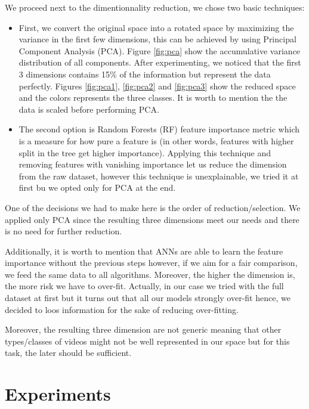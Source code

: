 \documentclass{article}
\begin{document}
We proceed next to the dimentionnality reduction, we chose two basic techniques:
\begin{itemize}
\item First, we convert the original space into a rotated space by maximizing the variance in the first few dimensions, this can be achieved by using Principal Component Analysis (PCA). Figure \ref{fig:pca} show the accumulative variance distribution of all components. After experimenting, we noticed that the first 3 dimensions contains 15\% of the information but represent the data perfectly. Figures \ref{fig:pca1}, \ref{fig:pca2} and \ref{fig:pca3} show the reduced space and the colors represents the three classes. It is worth to mention the the data is scaled before performing PCA.

\item The second option is Random Forests (RF) feature importance metric which is a measure for how pure a feature is (in other words, features with higher split in the tree get higher importance). Applying this technique and removing features with vanishing importance let us reduce the dimension from the raw dataset, however this technique is unexplainable, we tried it at first bu we opted only for PCA at the end.
\end{itemize}

One of the decisions we had to make here is the order of reduction/selection. We applied only PCA since the resulting three dimensions meet our needs and there is no need for further reduction.

Additionally, it is worth to mention that ANNs are able to learn the feature importance without the previous steps however, if we aim for a fair comparison, we feed the same data to all algorithms. Moreover, the higher the dimension is, the more risk we have to over-fit. Actually, in our case we tried with the full dataset at first but it turns out that all our models strongly over-fit hence, we decided to loos information for the sake of reducing over-fitting.

Moreover, the resulting three dimension are not generic meaning that other types/classes of videos might not be well represented in our space but for this task, the later should be sufficient.


\section{Experiments}
\end{document}
